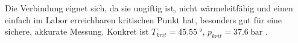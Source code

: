 \documentclass{subfiles}
\begin{document}
        \noindent Die Verbindung eignet sich, da sie ungiftig ist, nicht wärmeleitfähig und einen einfach im Labor erreichbaren kritischen Punkt hat, besonders gut für eine sichere, akkurate Messung. Konkret ist $T_{krit}=\SI{45.55}{\degree}$, $p_{krit}=\SI{37,6}{\bar}$ \cite{riessner}.
\end{document}
